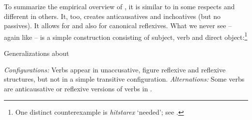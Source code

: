 \begin{exe}
\begin{xlist}
\begin{xlist}
\begin{exe}
\begin{xlist}
\begin{xlist}
\begin{exe}
\begin{xlist}
\begin{xlist}
\begin{exe}
\begin{exe}
\begin{xlist}
\begin{exe}
\begin{exe}
\begin{xlist}
\begin{exe}
\begin{exe}
\begin{exe}
\begin{exe}
\begin{exe}
\begin{xlist}
\begin{exe}
\begin{xlist}
\begin{exe}
\begin{exe}
\begin{xlist}
\begin{exe}
\begin{xlist}
\begin{exe}
\begin{xlist}
\begin{exe}
\begin{exe}
\begin{exe}
\begin{xlist}
\begin{exe}
\begin{exe}
\begin{exe}
\begin{xlist}
\begin{exe}
\begin{xlist}
\begin{exe}
\begin{exe}
\begin{xlist}
\begin{exe}
\begin{exe}
\begin{exe}
\begin{exe}
\begin{xlist}
\begin{exe}
\begin{xlist}
\begin{exe}
\begin{xlist}
\begin{exe}
\begin{xlist}
\begin{exe}
\begin{xlist}
\begin{exe}
\begin{xlist}
\begin{exe}
\begin{exe}
\begin{xlist}
\begin{exe}
\begin{xlist}
\begin{exe}
\begin{exe}
\begin{xlist}
\begin{exe}
\begin{xlist}
\begin{exe}
\begin{exe}
\begin{exe}
\begin{exe}
\begin{xlist}
\begin{xlist}
\begin{exe}
\begin{xlist}
\begin{exe}
\begin{exe}
\begin{exe}
\begin{xlist}
\begin{exe}
\begin{exe}
\begin{xlist}
\begin{exe}
\begin{exe}
\begin{exe}
\begin{xlist}
\begin{xlist}
\begin{exe}
\begin{xlist}
\begin{exe}
\begin{exe}
\begin{exe}
To summarize the empirical overview of {\thit}, it is similar to {\tnif} in some respects and different in others. It, too, creates anticausatives and inchoatives (but no passives). It allows for  and also for canonical reflexives. What we never see -- again like {\tnif} -- is a simple  construction consisting of subject, verb and direct object:\footnote{One distinct counterexample is \emph{hitstarex} `needed'; see \citet[130fn16]{harveskayne12}.}\pagebreak

 \begin{exe}
 \ex  \label{ex:gen-thit}Generalizations about {\thit}
 \begin{xlist} 
 	\ex  \textit{Configurations:} Verbs appear in unaccusative, figure reflexive and reflexive structures, but not in a simple transitive configuration. 
 	\ex \sloppy \textit{Alternations:} Some verbs are anticausative or reflexive versions of verbs in {\tpie}. 
 \z
\z 


\end{xlist}
\end{exe}
\end{exe}
\end{exe}
\end{exe}
\end{xlist}
\end{exe}
\end{xlist}
\end{xlist}
\end{exe}
\end{exe}
\end{exe}
\end{xlist}
\end{exe}
\end{exe}
\end{xlist}
\end{exe}
\end{exe}
\end{exe}
\end{xlist}
\end{exe}
\end{xlist}
\end{xlist}
\end{exe}
\end{exe}
\end{exe}
\end{exe}
\end{xlist}
\end{exe}
\end{xlist}
\end{exe}
\end{exe}
\end{xlist}
\end{exe}
\end{xlist}
\end{exe}
\end{exe}
\end{xlist}
\end{exe}
\end{xlist}
\end{exe}
\end{xlist}
\end{exe}
\end{xlist}
\end{exe}
\end{xlist}
\end{exe}
\end{xlist}
\end{exe}
\end{exe}
\end{exe}
\end{exe}
\end{xlist}
\end{exe}
\end{exe}
\end{xlist}
\end{exe}
\end{xlist}
\end{exe}
\end{exe}
\end{exe}
\end{xlist}
\end{exe}
\end{exe}
\end{exe}
\end{xlist}
\end{exe}
\end{xlist}
\end{exe}
\end{xlist}
\end{exe}
\end{exe}
\end{xlist}
\end{exe}
\end{xlist}
\end{exe}
\end{exe}
\end{exe}
\end{exe}
\end{exe}
\end{xlist}
\end{exe}
\end{exe}
\end{xlist}
\end{exe}
\end{exe}
\end{xlist}
\end{xlist}
\end{exe}
\end{xlist}
\end{xlist}
\end{exe}
\end{xlist}
\end{xlist}
\end{exe}
